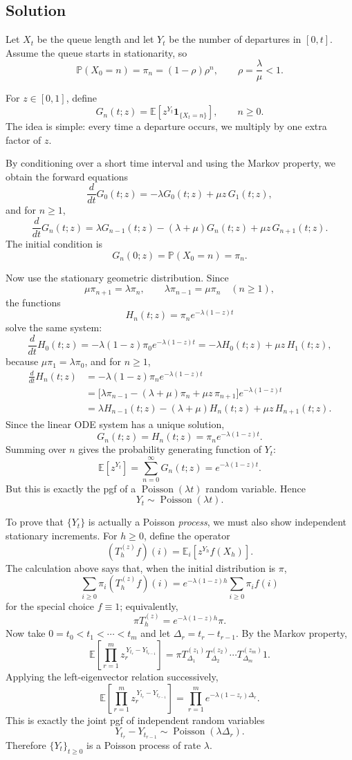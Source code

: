 \documentclass[11pt,a4paper]{article}
\newcommand{\E}{\mathbb{E}}
\newcommand{\Pois}{\operatorname{Poisson}}
\newcommand{\Pbb}{\mathbb{P}}
\newcommand{\1}{\mathbf{1}}
\begin{document}
\subsection*{Solution}
Let $X_t$ be the queue length and let $Y_t$ be the number of departures in $[0,t]$. Assume the queue starts in stationarity, so
\[
\Pbb(X_0=n)=\pi_n=(1-\rho)\rho^n,\qquad \rho=\frac{\lambda}{\mu}<1.
\]

For $z\in[0,1]$, define
\[
G_n(t;z)=\E\!\left[z^{Y_t}\1_{\{X_t=n\}}\right],\qquad n\ge 0.
\]
The idea is simple: every time a departure occurs, we multiply by one extra factor of $z$.

By conditioning over a short time interval and using the Markov property, we obtain the forward equations
\[
\frac{d}{dt}G_0(t;z)=-\lambda G_0(t;z)+\mu z\,G_1(t;z),
\]
and for $n\ge 1$,
\[
\frac{d}{dt}G_n(t;z)=\lambda G_{n-1}(t;z)-(\lambda+\mu)G_n(t;z)+\mu z\,G_{n+1}(t;z).
\]
The initial condition is
\[
G_n(0;z)=\Pbb(X_0=n)=\pi_n.
\]

Now use the stationary geometric distribution. Since
\[
\mu \pi_{n+1}=\lambda \pi_n,\qquad \lambda \pi_{n-1}=\mu \pi_n\quad (n\ge 1),
\]
the functions
\[
H_n(t;z)=\pi_n e^{-\lambda(1-z)t}
\]
solve the same system:
\[
\frac{d}{dt}H_0(t;z)=-\lambda(1-z)\pi_0e^{-\lambda(1-z)t}
=-\lambda H_0(t;z)+\mu z\,H_1(t;z),
\]
because $\mu\pi_1=\lambda\pi_0$, and for $n\ge 1$,
\begin{align*}
\frac{d}{dt}H_n(t;z)
&=-\lambda(1-z)\pi_n e^{-\lambda(1-z)t}\\
&=\bigl[\lambda \pi_{n-1}-(\lambda+\mu)\pi_n+\mu z\,\pi_{n+1}\bigr]e^{-\lambda(1-z)t}\\
&=\lambda H_{n-1}(t;z)-(\lambda+\mu)H_n(t;z)+\mu z\,H_{n+1}(t;z).
\end{align*}
Since the linear ODE system has a unique solution,
\[
G_n(t;z)=H_n(t;z)=\pi_n e^{-\lambda(1-z)t}.
\]
Summing over $n$ gives the probability generating function of $Y_t$:
\[
\E[z^{Y_t}]=\sum_{n=0}^{\infty}G_n(t;z)=e^{-\lambda(1-z)t}.
\]
But this is exactly the pgf of a $\Pois(\lambda t)$ random variable. Hence
\[
Y_t\sim \Pois(\lambda t).
\]

To prove that $\{Y_t\}$ is actually a Poisson \emph{process}, we must also show independent stationary increments. For $h\ge 0$, define the operator
\[
(T_h^{(z)}f)(i)=\E_i\!\left[z^{Y_h}f(X_h)\right].
\]
The calculation above says that, when the initial distribution is $\pi$,
\[
\sum_{i\ge 0}\pi_i (T_h^{(z)}f)(i)
=e^{-\lambda(1-z)h}\sum_{i\ge 0}\pi_i f(i)
\]
for the special choice $f\equiv 1$; equivalently,
\[
\pi T_h^{(z)}=e^{-\lambda(1-z)h}\pi.
\]
Now take $0=t_0<t_1<\cdots<t_m$ and let $\Delta_r=t_r-t_{r-1}$. By the Markov property,
\[
\E\!\left[\prod_{r=1}^m z_r^{\,Y_{t_r}-Y_{t_{r-1}}}\right]
=\pi T_{\Delta_1}^{(z_1)}T_{\Delta_2}^{(z_2)}\cdots T_{\Delta_m}^{(z_m)}1.
\]
Applying the left-eigenvector relation successively,
\[
\E\!\left[\prod_{r=1}^m z_r^{\,Y_{t_r}-Y_{t_{r-1}}}\right]
=\prod_{r=1}^m e^{-\lambda(1-z_r)\Delta_r}.
\]
This is exactly the joint pgf of independent random variables
\[
Y_{t_r}-Y_{t_{r-1}}\sim \Pois(\lambda \Delta_r).
\]
Therefore $\{Y_t\}_{t\ge 0}$ is a Poisson process of rate $\lambda$.
\end{document}
